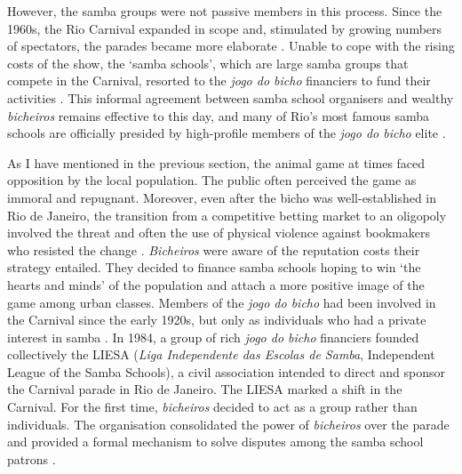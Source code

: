 However, the samba groups were not passive members in this process. Since the 1960s, the Rio Carnival expanded in scope and, stimulated by growing numbers of spectators, the parades became more elaborate \citetext{\citealp{cabral2016escolas}; \citealp[214]{chinelli1993vazio}; \citealp[240]{hertzman2013making}}. Unable to cope with the rising costs of the show, the `samba schools', which are large samba groups that compete in the Carnival, resorted to the \emph{jogo do bicho} financiers to fund their activities \citep{misse2007illegal}. This informal agreement between samba school organisers and wealthy \emph{bicheiros} remains effective to this day, and many of Rio's most famous samba schools are officially presided by high-profile members of the \emph{jogo do bicho} elite \citep{bezerra2009mecenato,cavalcanti2006carnaval,farias2013carnival,misse2011crime,queiroz1992carnaval}.

As I have mentioned in the previous section, the animal game at times faced opposition by the local population. The public often perceived the game as immoral and repugnant. Moreover, even after the bicho was well-established in Rio de Janeiro, the transition from a competitive betting market to an oligopoly involved the threat and often the use of physical violence against bookmakers who resisted the change \citetext{\citealp[143]{bezerra2009mecenato}, \citealp[52]{labronici2012paratodos}}. \emph{Bicheiros} were aware of the reputation costs their strategy entailed. They decided to finance samba schools hoping to win `the hearts and minds' of the population and attach a more positive image of the game among urban classes. Members of the \emph{jogo do bicho} had been involved in the Carnival since the early 1920s, but only as individuals who had a private interest in samba \citep[209]{chinelli1993vazio}. In 1984, a group of rich \emph{jogo do bicho} financiers founded collectively the LIESA (\emph{Liga Independente das Escolas de Samba}, Independent League of the Samba Schools), a civil association intended to direct and sponsor the Carnival parade in Rio de Janeiro. The LIESA marked a shift in the Carnival. For the first time, \emph{bicheiros} decided to act as a group rather than individuals. The organisation consolidated the power of \emph{bicheiros} over the parade and provided a formal mechanism to solve disputes among the samba school patrons \citetext{\citealp[43]{cavalcanti2006carnaval}; \citealp[171]{farias2013carnival}; \citealp[55]{labronici2012paratodos}}.

